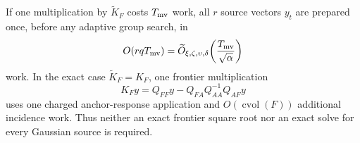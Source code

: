 \begin{theorem}
If one multiplication by $\widetilde K_F$ costs $T_{\rm mv}$ work, all
$r$ source vectors $y_t$ are prepared once, before any adaptive group search,
in
\begin{equation}
 O(rqT_{\rm mv})
 =\widetilde O_{\xi,\zeta,\upsilon,\delta}\!\left(
  \frac{T_{\rm mv}}{\sqrt\alpha}
 \right)
 \label{eq:frontier-whitening-work}
\end{equation}
work.  In the exact case $\widetilde K_F=K_F$, one frontier multiplication
\begin{equation}
 K_Fy=Q_{FF}y-Q_{FA}Q_{AA}^{-1}Q_{AF}y
 \label{eq:exact-frontier-matvec}
\end{equation}
uses one charged anchor-response application and
$O(\operatorname{cvol}(F))$ additional incidence work.  Thus neither an exact
frontier square root nor an exact solve for every Gaussian source is required.
\end{theorem}

